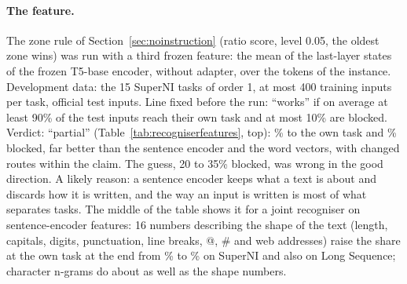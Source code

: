 \paragraph{The feature.} The zone rule of Section~\ref{sec:noinstruction} (ratio score, level 0.05, the oldest zone wins) was run with a third frozen feature: the mean of the last-layer states of the frozen T5-base encoder, without adapter, over the tokens of the instance. Development data: the 15 SuperNI tasks of order 1, at most 400 training inputs per task, official test inputs.
Line fixed before the run: ``works'' if on average at least 90\% of the test inputs reach their own task and at most 10\% are blocked. Verdict: ``partial'' (Table~\ref{tab:recogniserfeatures}, top): \AudZoneFrozenTOwn{}\% to the own task and \AudZoneFrozenTBlocked{}\% blocked, far better than the sentence encoder and the word vectors, with changed routes within the claim.
The guess, 20 to 35\% blocked, was wrong in the good direction. A likely reason: a sentence encoder keeps what a text is about and discards how it is written, and the way an input is written is most of what separates tasks. The middle of the table shows it for a joint recogniser on sentence-encoder features: 16 numbers describing the shape of the text (length, capitals, digits, punctuation, line breaks, @, \# and web addresses) raise the share at the own task at the end from \AudRecLrMiniEndSuperni{}\% to \AudRecLrShapeEndSuperni{}\% on SuperNI and also on Long Sequence; character n-grams do about as well as the shape numbers.

\begin{table}[t]
  \caption{Features, development data (the benchmark tasks were used to choose among the variants); means over tasks, in \%. Top: the zone rule with three frozen features on the 15 SuperNI tasks (inside own zone; blocked when the task arrives; own task at the end; route changed). Middle: a joint recogniser fitted by logistic regression or by Eq.~\eqref{eq:recogniser} on random cosine features, on the sentence encoder with or without the shape numbers or character n-grams, for SuperNI and Long Sequence; the last pair of columns is $(H{+}1)/(m{+}1)$, where $H$ of the $m$ held-out inputs of a task changed route (Proposition~\ref{prop:audit}), from the held-out inputs. Bottom: the audit of Proposition~\ref{prop:audit} for the chosen variant (logistic regression with shape numbers): $H/m$ and the 95\% bound.}
  \label{tab:recogniserfeatures}
  \centering
  
\end{table}

